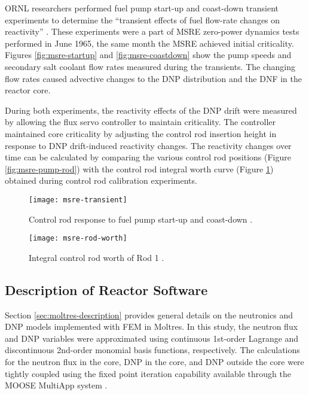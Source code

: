 \gls{ORNL} researchers performed fuel pump start-up and coast-down transient experiments to
determine the ``transient effects of fuel flow-rate changes on reactivity''
\cite{prince_zero-power_1968}. These experiments were a part of \gls{MSRE} zero-power dynamics
tests performed in June 1965, the same month the \gls{MSRE} achieved initial criticality. Figures
\ref{fig:msre-startup} and \ref{fig:msre-coastdown} show the pump speeds and secondary salt coolant
flow rates measured during the transients. The changing flow rates caused advective changes to the
\gls{DNP} distribution and the \gls{DNF} in the reactor core.

During both experiments, the reactivity effects of the \gls{DNP} drift were measured by
allowing the flux servo controller to maintain criticality. The controller maintained core
criticality by adjusting the control rod insertion height in response to \gls{DNP} drift-induced
reactivity changes. The reactivity changes over time can be calculated by comparing the various
control rod positions (Figure \ref{fig:msre-pump-rod}) with the control rod integral worth curve
(Figure \ref{fig:msre-rod-worth}) obtained during control rod calibration experiments.

\begin{figure}[htb]
  \centering
  \begin{minipage}[t]{0.49\textwidth}
    \centering
    \texttt{[image: msre-transient]}
    \caption{Control rod response to fuel pump start-up and coast-down
    \cite{prince_zero-power_1968}.}
    \label{fig:msre-pump-rod}
  \end{minipage}
  \hfill
  \begin{minipage}[t]{0.49\textwidth}
    \centering
    \texttt{[image: msre-rod-worth]}
    \caption{Integral control rod worth of Rod 1 \cite{prince_zero-power_1968}.}
    \label{fig:msre-rod-worth}
  \end{minipage}
\end{figure}

\subsection{Description of Reactor Software}

Section \ref{sec:moltres-description} provides general details on the neutronics and \gls{DNP}
models implemented with \gls{FEM} in Moltres. In this study, the neutron flux and \gls{DNP}
variables were approximated using continuous 1st-order Lagrange and discontinuous 2nd-order
monomial basis functions, respectively. The calculations for the neutron flux in the core,
\gls{DNP} in the core, and \gls{DNP} outside the core were tightly coupled using the fixed point
iteration capability available through the MOOSE MultiApp system \cite{gaston_physics-based_2015}.

